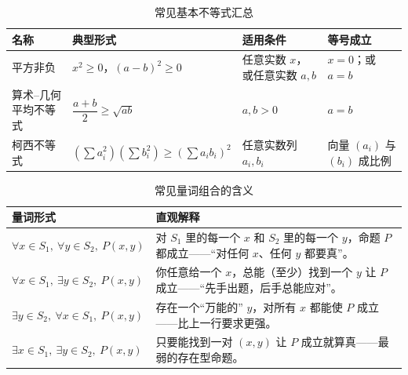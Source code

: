 \documentclass[a4paper,11pt]{ctexart}
\begin{document}
  \begin{table}[htbp]
    \centering
    \caption{常见基本不等式汇总}
    \begin{tabularx}{0.98\textwidth}{>{\raggedright\arraybackslash}p{2.8cm} X X X}
      \toprule
      \textbf{名称} & \textbf{典型形式} & \textbf{适用条件} & \textbf{等号成立} \\
      \midrule
      平方非负 & $x^2\ge 0$，$(a-b)^2\ge 0$ & 任意实数 $x$，或任意实数 $a,b$ & $x=0$；或 $a=b$ \\
      算术–几何平均不等式 & $\dfrac{a+b}{2}\ge\sqrt{ab}$ & $a,b>0$ & $a=b$ \\
      柯西不等式 & $(\sum a_i^2)(\sum b_i^2)\ge(\sum a_ib_i)^2$ & 任意实数列 $a_i,b_i$ & 向量 $(a_i)$ 与 $(b_i)$ 成比例 \\
      \bottomrule
    \end{tabularx}
  \end{table}

  \begin{table}[htbp]
    \centering
    \caption{常见量词组合的含义}
    \begin{tabularx}{0.98\textwidth}{>{\raggedright\arraybackslash}p{3.4cm} X}
      \toprule
      \textbf{量词形式} & \textbf{直观解释} \\
      \midrule
      $\forall x\in S_1,\ \forall y\in S_2,\ P(x,y)$
        & 对 $S_1$ 里的每一个 $x$ 和 $S_2$ 里的每一个 $y$，命题 $P$ 都成立——“对任何 $x$、任何 $y$ 都要真”。 \\
      $\forall x\in S_1,\ \exists y\in S_2,\ P(x,y)$
        & 你任意给一个 $x$，总能（至少）找到一个 $y$ 让 $P$ 成立——“先手出题，后手总能应对”。 \\
      $\exists y\in S_2,\ \forall x\in S_1,\ P(x,y)$
        & 存在一个“万能的” $y$，对所有 $x$ 都能使 $P$ 成立——比上一行要求更强。 \\
      $\exists x\in S_1,\ \exists y\in S_2,\ P(x,y)$
        & 只要能找到一对 $(x,y)$ 让 $P$ 成立就算真——最弱的存在型命题。 \\
      \bottomrule
    \end{tabularx}
  \end{table}

  \begin{center}
  \end{center}
\end{document}
